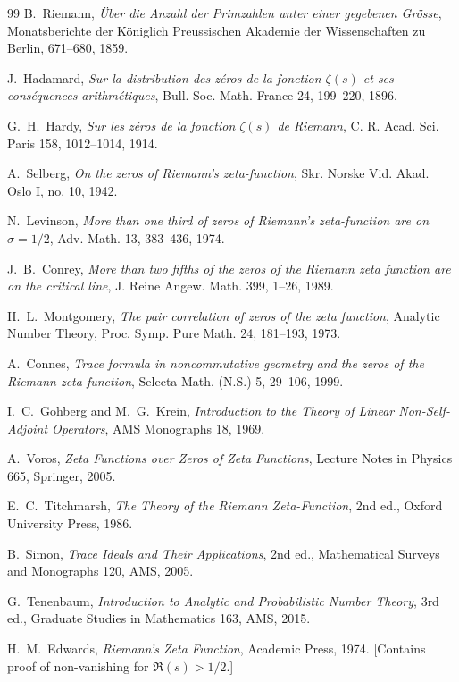 \documentclass[12pt]{article}
\theoremstyle{definition}
\theoremstyle{remark}
\begin{document}
\begin{thebibliography}{99}
B.~Riemann, \emph{\"Uber die Anzahl der Primzahlen unter einer gegebenen 
Gr\"osse}, Monatsberichte der K\"oniglich Preussischen Akademie der 
Wissenschaften zu Berlin, 671--680, 1859.

J.~Hadamard, \emph{Sur la distribution des z\'eros de la fonction $\zeta(s)$ 
et ses cons\'equences arithm\'etiques}, Bull. Soc. Math. France 24, 199--220, 1896.

G.~H.~Hardy, \emph{Sur les z\'eros de la fonction $\zeta(s)$ de Riemann}, 
C. R. Acad. Sci. Paris 158, 1012--1014, 1914.

A.~Selberg, \emph{On the zeros of Riemann's zeta-function}, 
Skr. Norske Vid. Akad. Oslo I, no. 10, 1942.

N.~Levinson, \emph{More than one third of zeros of Riemann's zeta-function 
are on $\sigma = 1/2$}, Adv. Math. 13, 383--436, 1974.

J.~B.~Conrey, \emph{More than two fifths of the zeros of the Riemann zeta 
function are on the critical line}, J. Reine Angew. Math. 399, 1--26, 1989.

H.~L.~Montgomery, \emph{The pair correlation of zeros of the zeta function}, 
Analytic Number Theory, Proc. Symp. Pure Math. 24, 181--193, 1973.

A.~Connes, \emph{Trace formula in noncommutative geometry and the zeros of 
the Riemann zeta function}, Selecta Math. (N.S.) 5, 29--106, 1999.

I.~C.~Gohberg and M.~G.~Krein, \emph{Introduction to the Theory of
Linear Non-Self-Adjoint Operators}, AMS Monographs 18, 1969.

A.~Voros, \emph{Zeta Functions over Zeros of Zeta Functions},
Lecture Notes in Physics 665, Springer, 2005.

E.~C.~Titchmarsh, \emph{The Theory of the Riemann Zeta-Function},
2nd ed., Oxford University Press, 1986.

B.~Simon, \emph{Trace Ideals and Their Applications}, 2nd ed.,
Mathematical Surveys and Monographs 120, AMS, 2005.

G.~Tenenbaum, \emph{Introduction to Analytic and Probabilistic Number Theory},
3rd ed., Graduate Studies in Mathematics 163, AMS, 2015.

H.~M.~Edwards, \emph{Riemann's Zeta Function}, Academic Press, 1974.
[Contains proof of non-vanishing for \(\Re(s) > 1/2\).]
\end{thebibliography}

\end{document}
